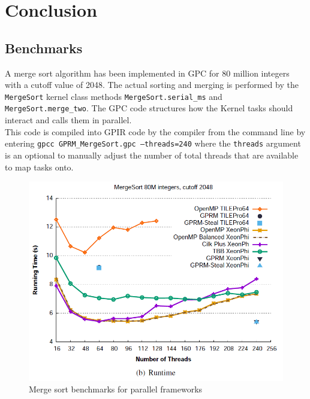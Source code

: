 \chapter{Conclusion}

\section{Benchmarks}

A merge sort algorithm has been implemented in GPC for 80 million integers with a cutoff value 
of 2048. The actual sorting and merging is performed by the \texttt{MergeSort} kernel class
methods \texttt{MergeSort.serial\_ms} and \texttt{MergeSort.merge\_two}. The GPC code structures
how the Kernel tasks should interact and calls them in parallel.\\ 



This code is compiled into GPIR code by the compiler from the command line by entering \texttt{gpcc GPRM\_MergeSort.gpc --threads=240}
where the \texttt{threads} argument is an optional to manually adjust the number of total threads that are available
to map tasks onto.

\newpage

\begin{figure}[!htb]
\includegraphics{graphs/benchmark.png}
\caption{Merge sort benchmarks for parallel frameworks \cite{GPRMBench}}
\label{fig:bench}
\end{figure}


